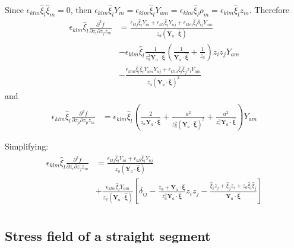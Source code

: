 Since   $\epsilon_{klm}\hat{\xi}_l\hat{\xi}_m=0$, then $\epsilon_{klm}\hat{\xi}_lY_m=\epsilon_{klm}\hat{\xi}_lY_{am}=\epsilon_{klm}\hat{\xi}_l\rho_m=\epsilon_{klm}\hat{\xi}_lz_m$. Therefore 
\begin{align}
\epsilon_{klm}\hat{\xi}_l\frac{\partial^3 f}{\partial  z_i\partial  z_j z_m}
&=\frac{\epsilon_{klj}\hat{\xi}_lY_{ai}+\epsilon_{kli}\hat{\xi}_lY_{aj}+\epsilon_{klm}\hat{\xi}_l\delta_{ij}Y_{am}}{z_a(\bm Y_a\cdot \hat{\bm \xi})}\\
&-\epsilon_{klm}\hat{\xi}_l\frac{1}{z_a^2\bm Y_a\cdot \hat{\bm \xi}}\left(\frac{1}{\bm Y_a\cdot \hat{\bm \xi}}+\frac{1}{z_a}\right)z_iz_jY_{am}\\
&-\frac{\epsilon_{klm}\hat{\xi}_l\hat{\xi}_iY_{am}Y_{aj}+\epsilon_{klm}\hat{\xi}_l\hat{\xi}_jz_iY_{am}}{z_a(\bm Y_a\cdot \hat{\bm \xi})^2}
\end{align}
and
\begin{align}
\epsilon_{klm}\hat{\xi}_l\frac{\partial^3 f}{\partial  z_p\partial  z_p z_m}&=\epsilon_{klm}\hat{\xi}_l\left(\frac{2}{z_a\bm Y_a\cdot \hat{\bm \xi}}+\frac{a^2}{z_a^2(\bm Y_a\cdot \hat{\bm \xi})^2}+\frac{a^2}{z_a^3 \bm Y_a\cdot \hat{\bm \xi}}\right)Y_{am}
\end{align}

Simplifying:
\begin{align}
\epsilon_{klm}\hat{\xi}_l\frac{\partial^3 f}{\partial  z_i\partial  z_j z_m}&=
\frac{\epsilon_{klj}\hat{\xi}_lY_{ai}+\epsilon_{kli}\hat{\xi}_lY_{aj}}{z_a(\bm Y_a\cdot \hat{\bm \xi})}\nonumber\\
&+\frac{\epsilon_{klm}\hat{\xi}_lY_{am}}{z_a(\bm Y_a\cdot \hat{\bm \xi})}\left[\delta_{ij}-\frac{z_a+\bm Y_a\cdot \hat{\bm \xi}}{z_a^2\bm Y_a\cdot \hat{\bm \xi}}z_iz_j-\frac{\hat{\xi}_iz_j+\hat{\xi}_jz_i+z_a\hat{\xi}_i\hat{\xi}_j}{\bm Y_a\cdot \hat{\bm \xi}}\right]\\
\end{align}


 
\subsection{Stress field of a straight segment}


